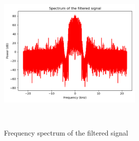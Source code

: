 \begin{enumerate}
\begin{enumerate}[a)]
                \begin{marginfigure}
                  \includegraphics[width=7.0cm, height=7.0cm]{ch13/figures/freq_spec_filter.png}
                  \caption{Frequency spectrum of the filtered signal}
                  \label{freq_spec_filter}
                \end{marginfigure}

        \end{enumerate}
\end{enumerate}